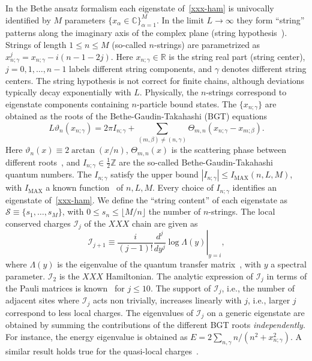 \documentclass[twocolumn,superscriptaddress,prb,10pt]{revtex4-1}
\begin{document}
In the Bethe ansatz formalism each eigenstate of~\eqref{xxx-ham} is univocally identified 
by $M$ parameters  $\{x_\alpha\in\mathbb{C}\}_{\alpha=1}^M$. In the limit $L\to\infty$ they 
form ``string'' patterns along the imaginary axis of the complex 
plane (string hypothesis~\cite{bethe-1931,taka-book}). Strings of length $1\le n\le M$ 
(so-called $n$-strings) are parametrized as $x_{n;\gamma}^{j}=x_{n;\gamma}-i(n-1-2j)$. 
Here $x_{n;\gamma}\in\mathbb{R}$ is the string real part (string center), $j=0,1,\dots,n-1$ 
labels different string components, and $\gamma$ denotes different string centers. The 
string hypothesis is not correct for finite chains, although deviations typically decay 
exponentially with $L$. Physically, the $n$-strings correspond to eigenstate components 
containing $n$-particle bound states. The $\{x_{n;\gamma}\}$ are obtained as the roots 
of the Bethe-Gaudin-Takahashi (BGT) equations~\cite{takahashi-1971,taka-book} 
%
\begin{equation}
L\vartheta_n(x_{n;\gamma})=2\pi I_{n;\gamma}+\sum\limits_{(m,\beta)
\ne(n,\gamma)}\Theta_{m,n}(x_{n;\gamma}-x_{m;\beta}).
\label{bt-eq}
\end{equation}
%
Here $\vartheta_n(x)\equiv2\arctan(x/n)$, $\Theta_{m,n}(x)$ is the scattering 
phase between different roots~\cite{taka-book}, and $I_{n;\gamma}\in\frac{1}{2}\mathbb{Z}$ are 
the so-called Bethe-Gaudin-Takahashi quantum numbers. The $I_{n;\gamma}$ satisfy the upper 
bound $|I_{n;\gamma}|\le I_{\textrm{MAX}}(n,L,M)$, with $I_{\textrm{MAX}}$ a known 
function~\cite{taka-book} of $n,L,M$. 
Every choice of $I_{n;\gamma}$ identifies an eigenstate of~\eqref{xxx-ham}. 
We define the ``string content'' of each eigenstate as ${\mathcal S}\equiv\{s_1,\dots,
s_M\}$, with $0\le s_n\le \lfloor M/n\rfloor$ the number of $n$-strings.  
The local conserved charges ${\mathcal I}_j$ of the $XXX$ chain are given as   
%
\begin{equation}
\label{I-def}
\left.{\mathcal I}_{j+1}\equiv\frac{i}{(j-1)!}\frac{d^j}{dy^j}\log\Lambda
(y)\right|_{y=i}, 
\end{equation}
%
where $\Lambda(y)$ is the eigenvalue of the quantum transfer matrix~\cite{kor-book}, 
with $y$ a spectral parameter. ${\mathcal I}_2$ is the $XXX$ Hamiltonian. 
The analytic expression of ${\mathcal I}_j$ in terms of the Pauli matrices is known~\cite{grabowski-1995}  
for $j\le 10$. The support of ${\mathcal I}_j$, i.e., the number of 
adjacent sites where ${\mathcal I}_j$ acts non trivially, increases linearly with $j$, i.e., 
larger $j$ correspond to less local charges.  
The eigenvalues of ${\mathcal I}_j$ on a generic eigenstate are 
obtained by summing the contributions of the different BGT roots {\it independently}. 
For instance, the energy eigenvalue is obtained as $E=2\sum_{n,\gamma} n/(n^2+x^2_{n;\gamma})$. 
A similar result holds true for the quasi-local charges~\cite{ilievski-2015a}. 
\end{document}
